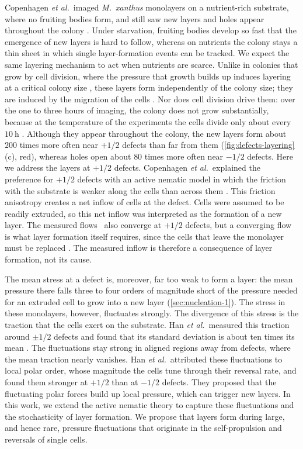 \documentclass[aps,pre,reprint,superscriptaddress,longbibliography,nofootinbib
]{revtex4-2}
\begin{document}
Copenhagen \textit{et al.}~imaged \textit{M.\ xanthus}
monolayers on a nutrient-rich substrate, where no fruiting
bodies form, and still saw new layers and holes appear
throughout the colony \cite{copenhagen2021}. Under
starvation, fruiting bodies develop so fast that the
emergence of new layers is hard to follow, whereas on
nutrients the colony stays a thin sheet in which single
layer-formation events can be tracked. We expect the same
layering mechanism to act when nutrients are scarce. Unlike
in colonies that grow by cell division, where the pressure
that growth builds up induces layering at a critical colony
size \cite{grant2014,you2019mono}, these layers form
independently of the colony size; they are induced by the
migration of the cells \cite{copenhagen2021}. Nor does cell
division drive them: over the one to three hours of
imaging, the colony does not grow substantially, because at
the temperature of the experiments the cells divide only
about every $10~\mathrm h$ \cite{copenhagen2021}. Although
they appear throughout the colony, the new layers form
about $200$ times more often near $+1/2$ defects than far
from them (\cref{fig:defects-layering}(c), red), whereas
holes open about $80$ times more often near $-1/2$ defects.
Here we address the layers at $+1/2$ defects. Copenhagen
\textit{et al.}~explained the preference for $+1/2$ defects
with an active nematic model in which the friction with the
substrate is weaker along the cells than across them
\cite{copenhagen2021}. This friction anisotropy creates a
net inflow of cells at the defect. Cells were assumed to be
readily extruded, so this net inflow was interpreted as the
formation of a new layer. The measured
flows~\cite{copenhagen2021,han2025local} also converge at
$+1/2$ defects, but a converging flow is what layer
formation itself requires, since the cells that leave the
monolayer must be replaced \cite{han2025local}. The
measured inflow is therefore a consequence of layer
formation, not its cause.

The mean stress at a defect is, moreover, far too weak to
form a layer: the mean pressure there falls three to four
orders of magnitude short of the pressure needed for an
extruded cell to grow into a new layer
(\cref{sec:nucleation-1}). The stress in these monolayers,
however, fluctuates strongly. The divergence of this stress
is the traction that the cells exert on the substrate. Han
\textit{et al.}~measured this traction around $\pm1/2$
defects and found that its standard deviation is about ten
times its mean \cite{han2025local}. The fluctuations stay
strong in aligned regions away from defects, where the mean
traction nearly vanishes. Han \textit{et al.}~attributed
these fluctuations to local polar order, whose magnitude
the cells tune through their reversal rate, and found them
stronger at $+1/2$ than at $-1/2$ defects. They proposed
that the fluctuating polar forces build up local pressure,
which can trigger new layers. In this work, we extend the
active nematic theory to capture these fluctuations and the
stochasticity of layer formation. We propose that layers
form during large, and hence rare, pressure fluctuations
that originate in the self-propulsion and reversals of
single cells.
\end{document}
